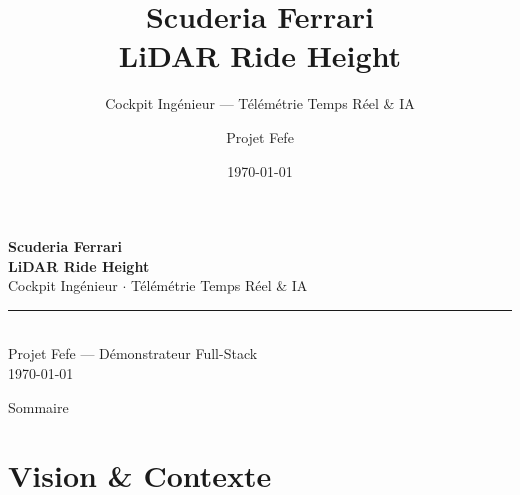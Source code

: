 \documentclass[11pt,aspectratio=169]{beamer}
\title{\textcolor{ferrariRed}{Scuderia Ferrari} \\ LiDAR Ride Height}
\subtitle{Cockpit Ing\'enieur — T\'el\'em\'etrie Temps R\'eel \& IA}
\author{Projet Fefe}
\date{\today}
\begin{document}
\begin{frame}[plain]
  \vspace{2cm}
  \begin{center}
    {\Huge \textbf{\textcolor{ferrariRed}{Scuderia Ferrari}}} \\[0.3cm]
    {\LARGE \textbf{LiDAR Ride Height}} \\[0.5cm]
    {\large Cockpit Ing\'enieur $\cdot$ T\'el\'em\'etrie Temps R\'eel \& IA} \\[1cm]
    \rule{4cm}{2pt} \\[0.5cm]
    {\normalsize Projet Fefe --- D\'emonstrateur Full-Stack} \\
    {\small \today}
  \end{center}
\end{frame}

\begin{frame}{Sommaire}
  \tableofcontents
\end{frame}

\section{Vision \& Contexte}
\end{document}
